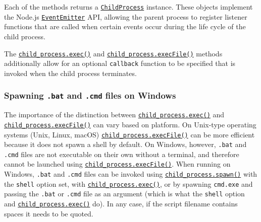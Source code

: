 Each of the methods returns a
\hyperref[class-childprocess]{\texttt{ChildProcess}} instance. These
objects implement the Node.js
\href{events.md\#class-eventemitter}{\texttt{EventEmitter}} API,
allowing the parent process to register listener functions that are
called when certain events occur during the life cycle of the child
process.

The
\hyperref[child_processexeccommand-options-callback]{\texttt{child\_process.exec()}}
and
\hyperref[child_processexecfilefile-args-options-callback]{\texttt{child\_process.execFile()}}
methods additionally allow for an optional \texttt{callback} function to
be specified that is invoked when the child process terminates.

\subsubsection{\texorpdfstring{Spawning \texttt{.bat} and \texttt{.cmd}
files on
Windows}{Spawning .bat and .cmd files on Windows}}\label{spawning-.bat-and-.cmd-files-on-windows}

The importance of the distinction between
\hyperref[child_processexeccommand-options-callback]{\texttt{child\_process.exec()}}
and
\hyperref[child_processexecfilefile-args-options-callback]{\texttt{child\_process.execFile()}}
can vary based on platform. On Unix-type operating systems (Unix, Linux,
macOS)
\hyperref[child_processexecfilefile-args-options-callback]{\texttt{child\_process.execFile()}}
can be more efficient because it does not spawn a shell by default. On
Windows, however, \texttt{.bat} and \texttt{.cmd} files are not
executable on their own without a terminal, and therefore cannot be
launched using
\hyperref[child_processexecfilefile-args-options-callback]{\texttt{child\_process.execFile()}}.
When running on Windows, \texttt{.bat} and \texttt{.cmd} files can be
invoked using
\hyperref[child_processspawncommand-args-options]{\texttt{child\_process.spawn()}}
with the \texttt{shell} option set, with
\hyperref[child_processexeccommand-options-callback]{\texttt{child\_process.exec()}},
or by spawning \texttt{cmd.exe} and passing the \texttt{.bat} or
\texttt{.cmd} file as an argument (which is what the \texttt{shell}
option and
\hyperref[child_processexeccommand-options-callback]{\texttt{child\_process.exec()}}
do). In any case, if the script filename contains spaces it needs to be
quoted.

